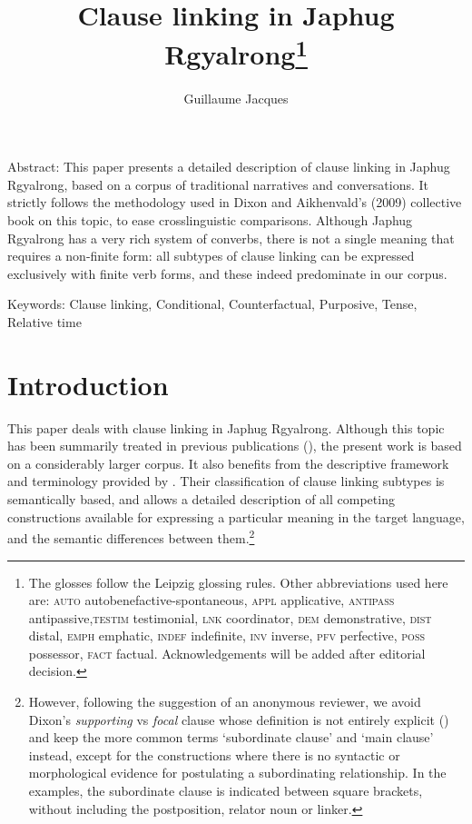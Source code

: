 \documentclass[oldfontcommands,oneside,a4paper,11pt]{article}
\begin{document}
 
\linenumbers
\title{Clause linking in Japhug Rgyalrong\footnote{
The glosses follow the Leipzig glossing rules. Other abbreviations used here are: \textsc{auto}  autobenefactive-spontaneous, \textsc{appl} applicative, \textsc{antipass} antipassive,\textsc{testim} testimonial, \textsc{lnk} coordinator, \textsc{dem} demonstrative, \textsc{dist} distal, \textsc{emph} emphatic, \textsc{indef} indefinite, \textsc{inv} inverse,  \textsc{pfv} perfective, \textsc{poss} possessor, \textsc{fact} factual. %
Acknowledgements will be added after editorial decision.  
} }
\author{Guillaume Jacques}
\maketitle

Abstract: This paper presents a detailed description of clause linking in Japhug Rgyalrong, based on a corpus of traditional narratives and conversations. It strictly follows the methodology used in Dixon and Aikhenvald's (2009) collective book on this topic, to ease crosslinguistic comparisons. Although Japhug Rgyalrong has a very rich system of converbs, there is not a single meaning that requires a non-finite form: all subtypes of clause linking can be expressed exclusively with finite verb forms, and these indeed predominate in our corpus.

Keywords: Clause linking, Conditional, Counterfactual, Purposive, Tense, Relative time 

\section{Introduction}

This paper  deals with clause linking in Japhug Rgyalrong. Although this topic has been summarily treated in previous publications (\citealt[317-325]{jacques08}), the present work is based on a considerably larger corpus. It also benefits from the descriptive framework and terminology provided by \citet{dixon09clause.linking}. Their classification of clause linking subtypes is semantically based, and allows a detailed description of all competing constructions available for expressing a particular meaning in the target language, and the semantic differences between them.\footnote{However,  following the suggestion of an anonymous reviewer, we avoid  Dixon's   \textit{supporting}   vs \textit{focal} clause whose definition is not entirely explicit (\citealt[2-5]{dixon09intro}) and keep the  more common terms `subordinate clause' and `main clause'  instead, except for the constructions where there is no syntactic or morphological evidence for postulating a subordinating relationship. In the examples, the subordinate clause is indicated between square brackets, without including the postposition, relator noun or linker.}
\end{document}
